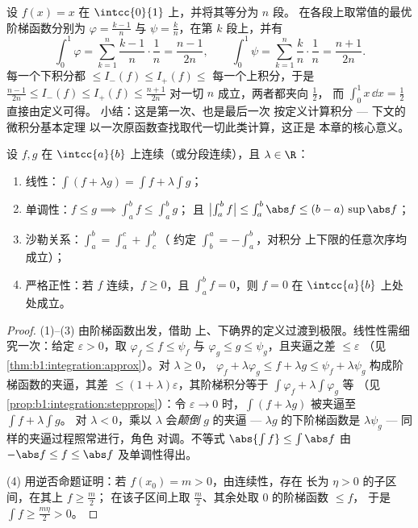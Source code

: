 \begin{example}[定义只需计算一次]\label{ex:b1:integration:defcompute}
设 $f(x) = x$ 在 $\intcc{0}{1}$ 上，并将其等分为 $n$ 段。
在各段上取常值的最优阶梯函数分别为 $\varphi =
\frac{k-1}{n}$ 与 $\psi = \frac kn$，在第 $k$ 段上，并有
\[
\int_0^1 \varphi = \sum_{k=1}^{n} \frac{k-1}{n}\cdot\frac1n
= \frac{n-1}{2n},
\qquad
\int_0^1 \psi = \sum_{k=1}^{n} \frac{k}{n}\cdot\frac1n
= \frac{n+1}{2n} .
\]
每一个下积分都 $\leq I_-(f) \leq I_+(f) \leq$
每一个上积分，于是 $\frac{n-1}{2n} \leq I_-(f) \leq I_+(f) \leq
\frac{n+1}{2n}$ 对一切 $n$ 成立，两者都夹向 $\frac12$，
而 $\int_0^1 x\,\dd x = \frac12$ 直接由定义可得。
小结：这是第一次、也是最后一次
按定义计算积分 --- 下文的微积分基本定理
以一次原函数查找取代一切此类计算，这正是
本章的核心意义。
\end{example}

\begin{theorem}[性质]\label{thm:b1:integration:props}
设 $f, g$ 在 $\intcc{a}{b}$ 上连续（或分段连续），且
$\lambda \in \R$：
\begin{enumerate}
  \item 线性：$\int (f + \lambda g) = \int f + \lambda \int g$；
  \item 单调性：$f \leq g \implies \int_a^b f \leq \int_a^b g$；
        且 $\bigl|\int_a^b f\bigr| \leq \int_a^b \abs f \leq (b -
        a)\, \sup\abs f$；
  \item 沙勒关系：$\int_a^b = \int_a^c + \int_c^b$（
        约定 $\int_b^a = -\int_a^b$，对积分
        上下限的任意次序均成立）；
  \item 严格正性：若 $f$ 连续，$f \geq 0$，且
        $\int_a^b f = 0$，则 $f = 0$ 在
        $\intcc{a}{b}$ 上处处成立。
\end{enumerate}
\end{theorem}

\begin{proof}
(1)--(3) 由阶梯函数出发，借助
上、下确界的定义过渡到极限。线性性需细究一次：给定
$\varepsilon > 0$，取 $\varphi_f \leq f \leq \psi_f$ 与
$\varphi_g \leq g \leq \psi_g$，且夹逼之差 $\leq \varepsilon$
（见\cref{thm:b1:integration:approx}）。对 $\lambda \geq 0$，
$\varphi_f + \lambda\varphi_g \leq f + \lambda g \leq \psi_f +
\lambda\psi_g$ 构成阶梯函数的夹逼，其差 $\leq
(1 + \lambda)\varepsilon$，其阶梯积分等于 $\int
\varphi_f + \lambda\int\varphi_g$ 等
（见\cref{prop:b1:integration:stepprops}）：令 $\varepsilon \to
0$ 时，$\int(f + \lambda g)$ 被夹逼至 $\int f + \lambda\int g$。
对 $\lambda < 0$，乘以 $\lambda$ 会\emph{颠倒}
$g$ 的夹逼 --- $\lambda g$ 的下阶梯函数是
$\lambda \psi_g$ --- 同样的夹逼过程照常进行，角色
对调。不等式 $\abs{\int f} \leq \int \abs f$ 由
$-\abs f \leq f \leq \abs f$ 及单调性得出。

(4) 用逆否命题证明：若 $f(x_0) = m > 0$，由连续性，存在
长为 $\eta > 0$ 的子区间，在其上 $f \geq \frac m2$；
在该子区间上取 $\frac m2$、其余处取 $0$ 的阶梯函数 $\leq f$，
于是 $\int f \geq \frac{m\eta}{2} > 0$。
\end{proof}

